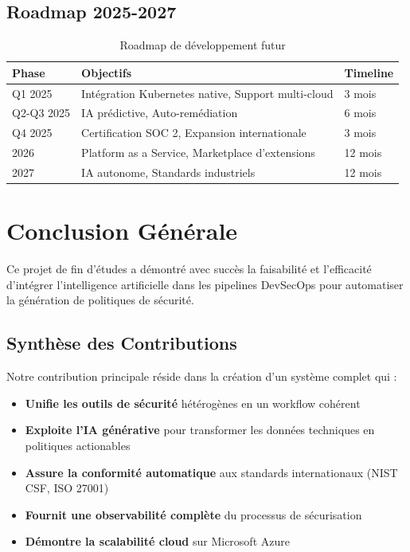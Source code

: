 \documentclass[12pt,a4paper]{report}
\begin{document}
\subsection{Roadmap 2025-2027}

\begin{table}[H]
    \centering
    \begin{tabularx}{\textwidth}{|X|X|X|}
        \hline
        \textbf{Phase} & \textbf{Objectifs} & \textbf{Timeline} \\
        \hline
        Q1 2025 & Intégration Kubernetes native, Support multi-cloud & 3 mois \\
        \hline
        Q2-Q3 2025 & IA prédictive, Auto-remédiation & 6 mois \\
        \hline
        Q4 2025 & Certification SOC 2, Expansion internationale & 3 mois \\
        \hline
        2026 & Platform as a Service, Marketplace d'extensions & 12 mois \\
        \hline
        2027 & IA autonome, Standards industriels & 12 mois \\
        \hline
    \end{tabularx}
    \caption{Roadmap de développement futur}
\end{table}

\section{Conclusion Générale}

Ce projet de fin d'études a démontré avec succès la faisabilité et l'efficacité d'intégrer l'intelligence artificielle dans les pipelines DevSecOps pour automatiser la génération de politiques de sécurité. 

\subsection{Synthèse des Contributions}

Notre contribution principale réside dans la création d'un système complet qui :

\begin{itemize}
    \item \textbf{Unifie les outils de sécurité} hétérogènes en un workflow cohérent
    \item \textbf{Exploite l'IA générative} pour transformer les données techniques en politiques actionables
    \item \textbf{Assure la conformité automatique} aux standards internationaux (NIST CSF, ISO 27001)
    \item \textbf{Fournit une observabilité complète} du processus de sécurisation
    \item \textbf{Démontre la scalabilité cloud} sur Microsoft Azure
\end{itemize}
\end{document}
